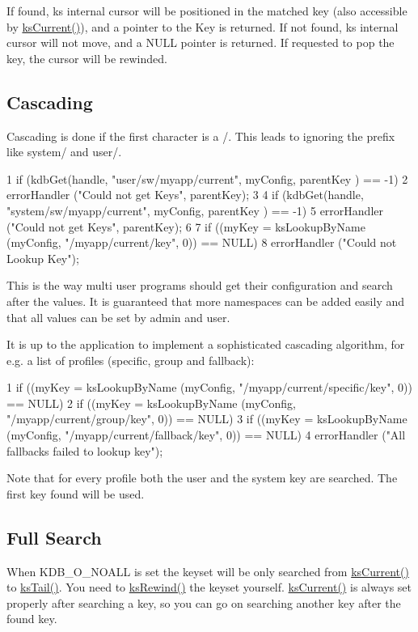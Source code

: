 If found, {\ttfamily ks} internal cursor will be positioned in the matched key (also accessible by \hyperlink{group__keyset_ga4287b9416912c5f2ab9c195cb74fb094}{ks\+Current()}), and a pointer to the Key is returned. If not found, {\ttfamily ks} internal cursor will not move, and a N\+U\+L\+L pointer is returned. If requested to pop the key, the cursor will be rewinded.\hypertarget{group__keyset_cascading}{}\subsection{Cascading}\label{group__keyset_cascading}
Cascading is done if the first character is a /. This leads to ignoring the prefix like system/ and user/. 
\begin{DoxyCode}
1 if (kdbGet(handle, "user/sw/myapp/current", myConfig, parentKey ) == -1)
2         errorHandler ("Could not get Keys", parentKey);
3 
4 if (kdbGet(handle, "system/sw/myapp/current", myConfig, parentKey ) == -1)
5         errorHandler ("Could not get Keys", parentKey);
6 
7 if ((myKey = ksLookupByName (myConfig, "/myapp/current/key", 0)) == NULL)
8         errorHandler ("Could not Lookup Key");
\end{DoxyCode}


This is the way multi user programs should get their configuration and search after the values. It is guaranteed that more namespaces can be added easily and that all values can be set by admin and user.

It is up to the application to implement a sophisticated cascading algorithm, for e.\+g. a list of profiles (specific, group and fallback)\+: 
\begin{DoxyCode}
1 if ((myKey = ksLookupByName (myConfig, "/myapp/current/specific/key", 0)) == NULL)
2         if ((myKey = ksLookupByName (myConfig, "/myapp/current/group/key", 0)) == NULL)
3                 if ((myKey = ksLookupByName (myConfig, "/myapp/current/fallback/key", 0)) == NULL)
4                         errorHandler ("All fallbacks failed to lookup key");
\end{DoxyCode}


Note that for every profile both the user and the system key are searched. The first key found will be used.\hypertarget{group__keyset_fullsearch}{}\subsection{Full Search}\label{group__keyset_fullsearch}
When K\+D\+B\+\_\+\+O\+\_\+\+N\+O\+A\+L\+L is set the keyset will be only searched from \hyperlink{group__keyset_ga4287b9416912c5f2ab9c195cb74fb094}{ks\+Current()} to \hyperlink{group__keyset_gadca442c4ab43cf532b15091d7711559e}{ks\+Tail()}. You need to \hyperlink{group__keyset_gabe793ff51f1728e3429c84a8a9086b70}{ks\+Rewind()} the keyset yourself. \hyperlink{group__keyset_ga4287b9416912c5f2ab9c195cb74fb094}{ks\+Current()} is always set properly after searching a key, so you can go on searching another key after the found key.

